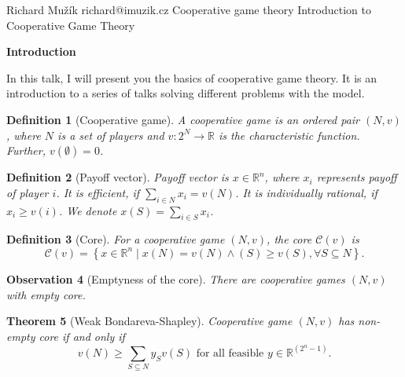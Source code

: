 \documentclass[12pt]{report}
\newcommand{\Talk}[4]{%
  \Id\FirstName #1 \Surname #2 \Email #3
  \Serie
  \Title #4
  \PaperAuthor
  \Link
  \Text\End
}
\newcommand{\PaperTalk}[6]{%
  \Id\FirstName #1 \Surname #2 \Email #3
  \Serie
  \Title #5
  \PaperAuthor #4
  \Link #6
  \Text\End
}
\newcommand{\SeriesTalk}[7]{%
  \Id\FirstName #1 \Surname #2 \Email #3
  \Serie #6
  \Title #5
  \PaperAuthor #4
  \Link #7
  \Text\End
}
\newcommand{\SeriesOther}[5]{%
  \Id\FirstName #1 \Surname #2 \Email #3
  \Serie #5
  \Title #4
  \PaperAuthor
  \Link
  \Text\End
}
\newcounter{theorem}
\newtheorem{definition}[theorem]{Definition}
\newtheorem{theorem}{Theorem}
\newtheorem{observation}[theorem]{Observation}
\def\section#1{\vskip 9pt plus 2pt minus 1pt\centerline{\bf #1}\par\ignorespaces}
\begin{document}
\SeriesOther{Richard}{Mužík}{richard@imuzik.cz}{Introduction to Cooperative Game Theory}{Cooperative game theory}
\section{Introduction}
In this talk, I will present you the basics of cooperative game theory. It is an introduction to a series of talks solving different problems with the model.

\begin{definition}[Cooperative game]
  A cooperative game is an ordered pair $(N,v)$, where $N$ is a set of players and $v\colon 2^N \to \mathbb{R}$ is the characteristic function. Further, $v(\emptyset) = 0$.
\end{definition}

\begin{definition}[Payoff vector]
  Payoff vector is $x \in \mathbb{R}^n$, where $x_i$ represents payoff of player $i$. It is efficient, if $\sum_{i \in N} x_i = v(N)$. It is individually rational, if $x_i \geq v(i)$. We denote $x(S)=\sum_{i \in S} x_i$.
\end{definition}

\begin{definition}[Core]
  For a cooperative game $(N,v)$, the core $\mathcal{C}(v)$ is
  \[
    \mathcal{C}(v) = \left\{x \in \mathbb{R}^n \mid x(N)=v(N) \land (S) \geq v(S), \forall S \subseteq N \right\}.
  \]
\end{definition}

\begin{observation}[Emptyness of the core]
  There are cooperative games $(N,v)$ with empty core.
\end{observation}

\begin{theorem}[Weak Bondareva-Shapley]
  Cooperative game $\left(N,v\right)$ has non-empty core if and only if 
	\[
		v\left(N\right) \geq \sum_{S \subseteq N} y_S v\left(S\right)\text{ for all feasible }y \in \mathbb{R}^{\left(2^n-1\right)}.
	\]
\end{theorem}
\end{document}
